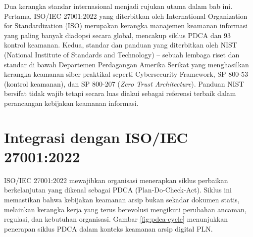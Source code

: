 \documentclass[12pt,a4paper]{report}
\begin{document}
Dua kerangka standar internasional menjadi rujukan utama dalam bab ini. Pertama, ISO/IEC 27001:2022 yang diterbitkan oleh International Organization for Standardization (ISO) merupakan kerangka manajemen keamanan informasi yang paling banyak diadopsi secara global, mencakup siklus PDCA dan 93 kontrol keamanan. Kedua, standar dan panduan yang diterbitkan oleh NIST (National Institute of Standards and Technology) -- sebuah lembaga riset dan standar di bawah Departemen Perdagangan Amerika Serikat yang menghasilkan kerangka keamanan siber praktikal seperti Cybersecurity Framework, SP 800-53 (kontrol keamanan), dan SP 800-207 (\textit{Zero Trust Architecture}). Panduan NIST bersifat tidak wajib tetapi secara luas diakui sebagai referensi terbaik dalam perancangan kebijakan keamanan informasi.


\section{Integrasi dengan ISO/IEC 27001:2022}

ISO/IEC 27001:2022 mewajibkan organisasi menerapkan siklus perbaikan berkelanjutan yang dikenal sebagai PDCA (Plan-Do-Check-Act). Siklus ini memastikan bahwa kebijakan keamanan arsip bukan sekadar dokumen statis, melainkan kerangka kerja yang terus berevolusi mengikuti perubahan ancaman, regulasi, dan kebutuhan organisasi. Gambar \ref{fig:pdca-cycle} menunjukkan penerapan siklus PDCA dalam konteks keamanan arsip digital PLN.

\end{document}
